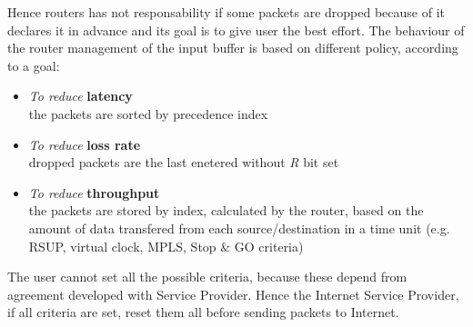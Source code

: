 Hence routers has not responsability if some packets are dropped because of it declares it in advance and its goal is to give user the best effort. The behaviour of the router management of the input buffer is based on different policy, according to a goal:\\
\begin{itemize}
\item{\textit{To reduce} \textbf{latency}\\
the packets are sorted by precedence index
}
\item{\textit{To reduce} \textbf{loss rate}\\
dropped packets are the last enetered without \textit{R} bit set
}
\item{\textit{To reduce} \textbf{throughput}\\
the packets are stored by index, calculated by the router, based on the amount of data transfered from each source/destination in a time unit (e.g. RSUP, virtual clock, MPLS, Stop \& GO criteria)
}
\end{itemize}
The user cannot set all the possible criteria, because these depend from agreement developed with Service Provider. Hence the Internet Service Provider, if all criteria are set, reset them all before sending packets to Internet.
